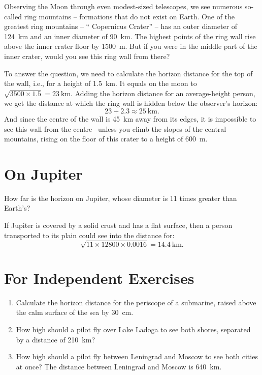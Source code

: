 \ques Observing the Moon through even modest-sized telescopes, we see numerous so-called ring mountains -- formations that do not exist on Earth. One of the greatest ring mountains -- `` Copernicus Crater'' -- has an outer diameter of \SI{124}{\kilo\meter} and an inner diameter of \SI{90}{\kilo\meter}. The highest points of the ring wall rise above the inner crater floor by \SI{1500}{\meter}. But if you were in the middle part of the inner crater, would you see this ring wall from there?

\ans To answer the question, we need to calculate the horizon distance for the top of the wall, i.e., for a height of \SI{1.5}{\kilo\meter}. It equals on the moon to $\sqrt{3500 \times 1.5} = \SI{23}{\kilo\meter}$. Adding the horizon distance for an average-height person, we get the distance at which the ring wall is hidden below the observer's horizon:
\begin{equation*}%
23 + 2.3 \approx \SI{25}{\kilo\meter}.
\end{equation*}
And since the centre of the wall is \SI{45}{\kilo\meter} away from its edges, it is impossible to see this wall from the centre --unless you climb the slopes of the central mountains, rising on the floor of this crater to a height of \SI{600}{\meter}.

\section{On Jupiter}
\label{sec-6.12}

\ques How far is the horizon on Jupiter, whose diameter is 11 times greater than Earth's?

\ans If Jupiter is covered by a solid crust and has a flat surface, then a person transported to its plain could see into the distance for:
\begin{equation*}%
\sqrt{11 \times 12800 \times 0.0016} = \SI{14.4}{\kilo\meter}.
\end{equation*}

\section*{For Independent Exercises}
\begin{enumerate}
\item Calculate the horizon distance for the periscope of a submarine, raised above the calm surface of the sea by \SI{30}{\centi\meter}.

\item How high should a pilot fly over Lake Ladoga to see both shores, separated by a distance of \SI{210}{\kilo\meter}?

\item How high should a pilot fly between Leningrad and Moscow to see both cities at once? The distance between Leningrad and Moscow is \SI{640}{\kilo\meter}.
\end{enumerate}


